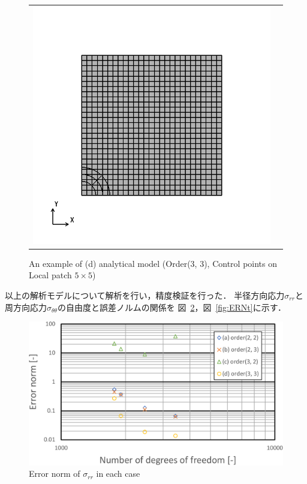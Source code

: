 \begin{figure}[htbp]
\begin{tabular}{cc}
\begin{minipage}[t]{0.45\hsize}
      \includegraphics[keepaspectratio, scale=0.3]
      {fig/result_data_etc/s-iga01/model/33.png}
      \caption{An example of (d) analytical model (Order(3, 3), Control points on Local patch $5\times 5$)}
      \label{fig:33}
    \end{minipage}
  \end{tabular}
\end{figure}

\noindent
以上の解析モデルについて解析を行い，精度検証を行った．
半径方向応力$\sigma_{rr}$と周方向応力$\sigma_{\theta\theta}$の自由度と誤差ノルムの関係を
図~\ref{fig:ERNr}，図~\ref{fig:ERNt}に示す．

\begin{figure}[htbp]
  \centering
  \includegraphics[keepaspectratio, scale=0.5]
  {fig/result_data_etc/s-iga01/r-crop.pdf}
  \caption{Error norm of $\sigma_{rr}$ in each case}
  \label{fig:ERNr}
\end{figure}

